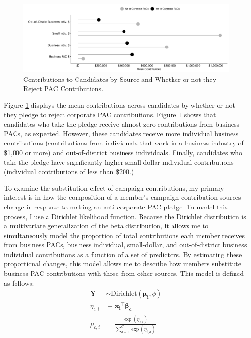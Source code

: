 \documentclass[12pt]{article}
\begin{document}
\begin{figure}[!htb]
    \centering
    \includegraphics[width=0.9\linewidth]{all_candy.pdf}
    \caption{Contributions to Candidates by Source and Whether or not they Reject PAC Contributions.}
    \label{fig: all contribs}
\end{figure}

Figure \ref{fig: all contribs} displays the mean contributions across candidates by whether or not they pledge to reject corporate PAC contributions. Figure \ref{fig: all contribs} shows that candidates who take the pledge receive almost zero contributions from business PACs, as expected. However, these candidates receive more individual business contributions (contributions from individuals that work in a business industry of \$1,000 or more) and out-of-district business individuals.  Finally, candidates who take the pledge have significantly higher small-dollar individual contributions (individual contributions of less than \$200.)

To examine the substitution effect of campaign contributions, my primary interest is in how the composition of a member's campaign contribution sources change in response to making an anti-corporate PAC pledge. To model this process, I use a Dirichlet likelihood function. Because the Dirichlet distribution is a multivariate generalization of the beta distribution, it allows me to simultaneously model the proportion of total contributions each member receives from business PACs, business individual, small-dollar, and out-of-district business individual contributions as a function of a set of predictors. By estimating these proportional changes, this model allows me to describe how members substitute business PAC contributions with those from other sources. This model is defined as follows: 
$$
\begin{aligned}
\bm{Y} &\sim \text{Dirichlet}(\bm{\mu_i}, \phi) \\
\eta_{c,i} &= \bm{x_i}^\top \bm{\beta_c} \\
\mu_{c,i} &= \frac{\exp(\eta_{c,i})}{\sum^{C}_{d=1}\exp(\eta_{i,d})} \\
\end{aligned}
$$
\end{document}
